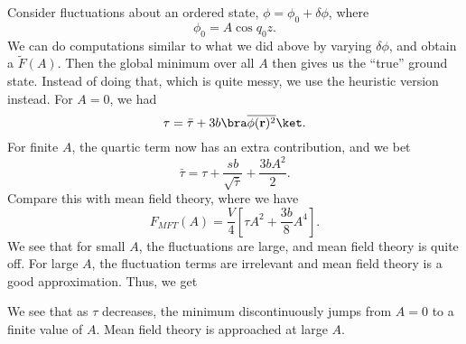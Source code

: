 \documentclass[a4paper]{article}
\newcommand\splus{\!{\vphantom{\prod}}^+}
\begin{document}
Consider fluctuations about an ordered state, $\phi = \phi_0 + \delta \phi$, where
\[
  \phi_0 = A \cos q_0 z.
\]
We can do computations similar to what we did above by varying $\delta \phi$, and obtain a $\tilde{F}(A)$. Then the global minimum over all $A$ then gives us the ``true'' ground state. Instead of doing that, which is quite messy, we use the heuristic version instead. For $A = 0$, we had
%
\[
  \tau = \bar{\tau} + 3b \bra \overline{\phi(\mathbf{r})^2}\ket.
\]
For finite $A$, the quartic term now has an extra contribution, and we bet
\[
  \bar{\tau} = \tau + \frac{sb}{\sqrt{\bar{\tau}}} + \frac{3b A^2}{2}.
\]
Compare this with mean field theory, where we have
\[
  F_{MFT}(A) = \frac{V}{4} \left[\tau A^2 + \frac{3b}{8} A^4\right].
\]
We see that for small $A$, the fluctuations are large, and mean field theory is quite off. For large $A$, the fluctuation terms are irrelevant and mean field theory is a good approximation. Thus, we get
\begin{center}
\end{center}

We see that as $\tau$ decreases, the minimum discontinuously jumps from $A = 0$ to a finite value of $A$. Mean field theory is approached at large $A$.
\end{document}
